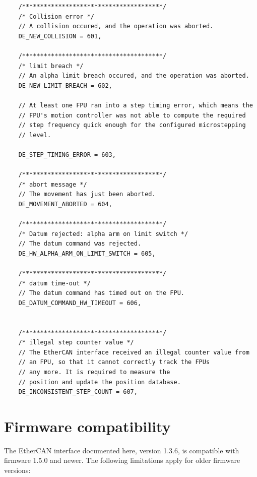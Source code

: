\documentclass[11pt,a4paper]{report}
\begin{document}
\begin{verbatim}
    /***************************************/
    /* Collision error */
    // A collision occured, and the operation was aborted.
    DE_NEW_COLLISION = 601,

    /***************************************/
    /* limit breach */
    // An alpha limit breach occured, and the operation was aborted.
    DE_NEW_LIMIT_BREACH = 602,

    // At least one FPU ran into a step timing error, which means the
    // FPU's motion controller was not able to compute the required
    // step frequency quick enough for the configured microstepping
    // level.

    DE_STEP_TIMING_ERROR = 603,

    /***************************************/
    /* abort message */
    // The movement has just been aborted.
    DE_MOVEMENT_ABORTED = 604,

    /***************************************/
    /* Datum rejected: alpha arm on limit switch */
    // The datum command was rejected.
    DE_HW_ALPHA_ARM_ON_LIMIT_SWITCH = 605,

    /***************************************/
    /* datum time-out */
    // The datum command has timed out on the FPU.
    DE_DATUM_COMMAND_HW_TIMEOUT = 606,


    /***************************************/
    /* illegal step counter value */
    // The EtherCAN interface received an illegal counter value from
    // an FPU, so that it cannot correctly track the FPUs
    // any more. It is required to measure the
    // position and update the position database.
    DE_INCONSISTENT_STEP_COUNT = 607,

\end{verbatim}

\section{Firmware compatibility}
\label{sec:firmware_compatibility}

The EtherCAN interface documented here, version 1.3.6, is compatible with firmware
1.5.0 and newer. The following limitations apply for older firmware versions:
\end{document}
